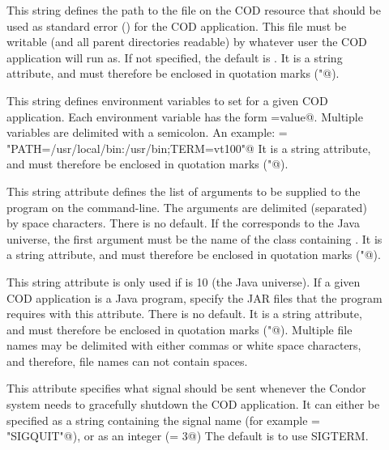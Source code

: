 \begin{description}
 \item[] This string defines the path to the file on the
   COD resource that should be used as standard error ()
   for the COD application.
   This file must be writable (and all parent directories readable) by
   whatever user the COD application will run as.
   If not specified, the default is .
   It is a string attribute, and must therefore be enclosed in 
   quotation marks (\verb@"@).

 \item[] This string defines environment variables to
   set for a given COD application.
   Each environment variable has the form \verb@NAME=value@.
   Multiple variables are delimited with a semicolon.
   An example: \verb@Env = "PATH=/usr/local/bin:/usr/bin;TERM=vt100"@ 
   It is a string attribute, and must therefore be enclosed in 
   quotation marks (\verb@"@).

 \item[] This string attribute defines the list of
   arguments to be supplied to the program on the command-line.
   The arguments are delimited (separated) by space characters. 
   There is no default. 
   If the  corresponds to the Java
   universe, the first argument must be the name of the class
   containing .
   It is a string attribute, and must therefore be enclosed in 
   quotation marks (\verb@"@).

 \item[] This string attribute is only used if
    is 10 (the Java universe).
   If a given COD application is a Java program, specify the
   JAR files that the program requires with this attribute.
   There is no default.
   It is a string attribute, and must therefore be enclosed in 
   quotation marks (\verb@"@).
   Multiple file names may be delimited with either commas or white space
   characters, and
   therefore, file names can not contain spaces.

 \item[] This attribute specifies what signal should be
   sent whenever the Condor system needs to gracefully shutdown the
   COD application.
   It can either be specified as a string containing the signal name
   (for example \verb@KillSig = "SIGQUIT"@), or as an integer
   (\verb@KillSig = 3@)
   The default is to use SIGTERM.


\end{description}
